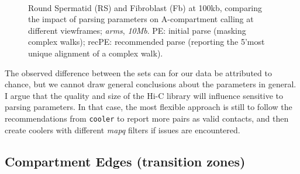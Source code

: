 \documentclass[
  11pt,
  a4paper,
]{scrbook}
\let\oldemph\emph
\renewcommand\emph[1]{\oldemph{\color{gray}#1}}
\begin{document}
\begin{figure}
\begin{minipage}{0.40\linewidth}
{}


\end{minipage}%
%
\begin{minipage}{0.40\linewidth}



\end{minipage}%
%
\begin{minipage}{0.10\linewidth}
~\end{minipage}%

\caption{\label{fig-rs-fb-100-pe-recpe-intervals}Round Spermatid (RS)
and Fibroblast (Fb) at 100kb, comparing the impact of parsing parameters
on A-compartment calling at different viewframes; \emph{arms},
\emph{10Mb}. PE: initial parse (masking complex walks); recPE:
recommended parse (reporting the 5'most unique alignment of a complex
walk).}

\end{figure}%

The observed difference between the sets can for our data be attributed
to chance, but we cannot draw general conclusions about the parameters
in general. I argue that the quality and size of the Hi-C library will
influence sensitive to parsing parameters. In that case, the most
flexible approach is still to follow the recommendations from
\texttt{cooler} to report more pairs as valid contacts, and then create
coolers with different \emph{mapq} filters if issues are encountered.

\subsection{Compartment Edges (transition
zones)}\label{compartment-edges-transition-zones}
\end{document}
